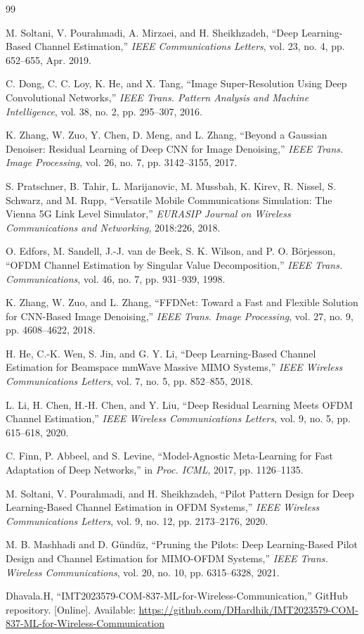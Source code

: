 \documentclass[a4paper,10pt]{article}
\begin{document}
{\small
\begin{thebibliography}{99}

M. Soltani, V. Pourahmadi, A. Mirzaei, and H. Sheikhzadeh,
``Deep Learning-Based Channel Estimation,''
\textit{IEEE Communications Letters}, vol. 23, no. 4, pp. 652--655, Apr. 2019.

C. Dong, C. C. Loy, K. He, and X. Tang,
``Image Super-Resolution Using Deep Convolutional Networks,''
\textit{IEEE Trans. Pattern Analysis and Machine Intelligence}, vol. 38, no. 2, pp. 295--307, 2016.

K. Zhang, W. Zuo, Y. Chen, D. Meng, and L. Zhang,
``Beyond a Gaussian Denoiser: Residual Learning of Deep CNN for Image Denoising,''
\textit{IEEE Trans. Image Processing}, vol. 26, no. 7, pp. 3142--3155, 2017.

S. Pratschner, B. Tahir, L. Marijanovic, M. Mussbah, K. Kirev, R. Nissel, S. Schwarz, and M. Rupp,
``Versatile Mobile Communications Simulation: The Vienna 5G Link Level Simulator,''
\textit{EURASIP Journal on Wireless Communications and Networking}, 2018:226, 2018.

O. Edfors, M. Sandell, J.-J. van de Beek, S. K. Wilson, and P. O. B\"orjesson,
``OFDM Channel Estimation by Singular Value Decomposition,''
\textit{IEEE Trans. Communications}, vol. 46, no. 7, pp. 931--939, 1998.

K. Zhang, W. Zuo, and L. Zhang,
``FFDNet: Toward a Fast and Flexible Solution for CNN-Based Image Denoising,''
\textit{IEEE Trans. Image Processing}, vol. 27, no. 9, pp. 4608--4622, 2018.

H. He, C.-K. Wen, S. Jin, and G. Y. Li,
``Deep Learning-Based Channel Estimation for Beamspace mmWave Massive MIMO Systems,''
\textit{IEEE Wireless Communications Letters}, vol. 7, no. 5, pp. 852--855, 2018.

L. Li, H. Chen, H.-H. Chen, and Y. Liu,
``Deep Residual Learning Meets OFDM Channel Estimation,''
\textit{IEEE Wireless Communications Letters}, vol. 9, no. 5, pp. 615--618, 2020.

C. Finn, P. Abbeel, and S. Levine,
``Model-Agnostic Meta-Learning for Fast Adaptation of Deep Networks,''
in \textit{Proc. ICML}, 2017, pp. 1126--1135.

M. Soltani, V. Pourahmadi, and H. Sheikhzadeh,
``Pilot Pattern Design for Deep Learning-Based Channel Estimation in OFDM Systems,''
\textit{IEEE Wireless Communications Letters}, vol. 9, no. 12, pp. 2173--2176, 2020.

M. B. Mashhadi and D. G\"und\"uz,
``Pruning the Pilots: Deep Learning-Based Pilot Design and Channel Estimation for MIMO-OFDM Systems,''
\textit{IEEE Trans. Wireless Communications}, vol. 20, no. 10, pp. 6315--6328, 2021.

Dhavala.H,
``IMT2023579-COM-837-ML-for-Wireless-Communication,''
GitHub repository.
[Online]. Available: \url{https://github.com/DHardhik/IMT2023579-COM-837-ML-for-Wireless-Communication}

\end{thebibliography}
}
\end{document}
